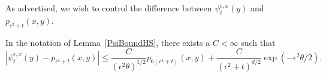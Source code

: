 \documentclass[EJP]{ejpecp} %
\newcommand{\IP}{\mathbb P}
\begin{document}
As advertised, we wish to control the difference between
$\psi_t^{\epsilon,x}(y)$
and $p_{\epsilon^2 + t}(x, y)$.

\begin{lemma}
    \label{Lemma:BoundPsiHS2}
    In the notation of Lemma~\ref{PsiBoundHS},
    there exists a $C < \infty$ such that
	\begin{equation}
\label{heat kernel estimate}
        \left|
            \psi_t^{\epsilon, x}(y)
            -
            p_{\epsilon^2 + t}(x, y)
        \right|
\le
        \frac{C}{(\epsilon^2 \theta)^{1/2}}
        p_{6(\epsilon^2+t)}(x, y)
        +
	    \frac{C}{(\epsilon^2 + t)^{d/2}}
	    \exp(- \epsilon^2 \theta / 2)
	    .
	\end{equation}
\end{lemma}
\end{document}
